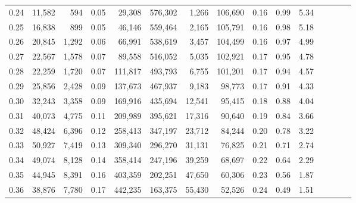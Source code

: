 \begin{tabular}{rrrcrrrrrrrrrrr}
0.24 &  11,582 &    594 &                                       0.05 &   29,308 &  576,302 &    1,266 &  106,690 &  0.16 &  0.99 &                         5.34 \\
0.25 &  16,838 &    899 &                                       0.05 &   46,146 &  559,464 &    2,165 &  105,791 &  0.16 &  0.98 &                         5.18 \\
0.26 &  20,845 &  1,292 &                                       0.06 &   66,991 &  538,619 &    3,457 &  104,499 &  0.16 &  0.97 &                         4.99 \\
0.27 &  22,567 &  1,578 &                                       0.07 &   89,558 &  516,052 &    5,035 &  102,921 &  0.17 &  0.95 &                         4.78 \\
0.28 &  22,259 &  1,720 &                                       0.07 &  111,817 &  493,793 &    6,755 &  101,201 &  0.17 &  0.94 &                         4.57 \\
0.29 &  25,856 &  2,428 &                                       0.09 &  137,673 &  467,937 &    9,183 &   98,773 &  0.17 &  0.91 &                         4.33 \\
0.30 &  32,243 &  3,358 &                                       0.09 &  169,916 &  435,694 &   12,541 &   95,415 &  0.18 &  0.88 &                         4.04 \\
0.31 &  40,073 &  4,775 &                                       0.11 &  209,989 &  395,621 &   17,316 &   90,640 &  0.19 &  0.84 &                         3.66 \\
0.32 &  48,424 &  6,396 &                                       0.12 &  258,413 &  347,197 &   23,712 &   84,244 &  0.20 &  0.78 &                         3.22 \\
0.33 &  50,927 &  7,419 &                                       0.13 &  309,340 &  296,270 &   31,131 &   76,825 &  0.21 &  0.71 &                         2.74 \\
0.34 &  49,074 &  8,128 &                                       0.14 &  358,414 &  247,196 &   39,259 &   68,697 &  0.22 &  0.64 &                         2.29 \\
0.35 &  44,945 &  8,391 &                                       0.16 &  403,359 &  202,251 &   47,650 &   60,306 &  0.23 &  0.56 &                         1.87 \\
0.36 &  38,876 &  7,780 &                                       0.17 &  442,235 &  163,375 &   55,430 &   52,526 &  0.24 &  0.49 &                         1.51 \\

\end{tabular}
